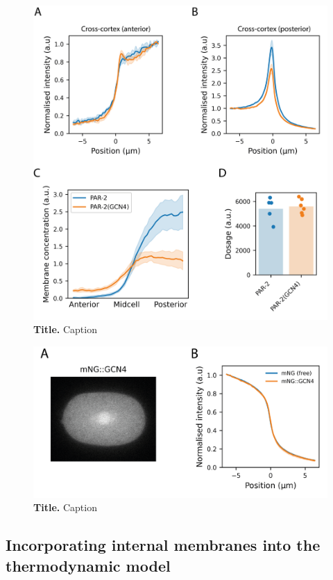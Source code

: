\documentclass[12pt]{"article"}
\newcommand{\mycaption}[2]{\caption[#1]{\textbf{#1.} #2}}
\begin{document}
\begin{figure}[!h]
\includegraphics[scale=1]{gcn4_quantification}
\setlength{\abovecaptionskip}{20pt}
\centering
\mycaption{Title}{Caption}
\label{fig:gcn4_quantification}
\end{figure}

\begin{figure}[!h]
\includegraphics[scale=1]{gcn4_alone}
\setlength{\abovecaptionskip}{20pt}
\centering
\mycaption{Title}{Caption}
\label{fig:gcn4_alone}
\end{figure}

\clearpage
\subsection{Incorporating internal membranes into the thermodynamic model}
\end{document}

